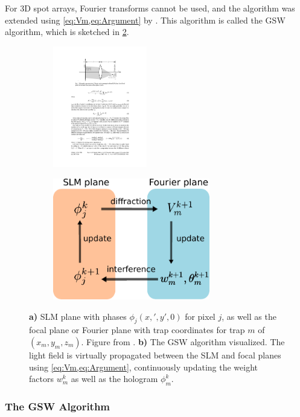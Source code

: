For 3D spot arrays, Fourier transforms cannot be used, and the algorithm was extended using \cref{eq:Vm,eq:Argument} by \cite{DiLeonardo2007}. 
This algorithm is called the \ac{GSW} algorithm, which is sketched in \cref{fig:GSWalgorithm}.

\begin{figure}
	\centering
	\begin{subfigure}{.56\textwidth}
		\centering
		\includegraphics[height=5.3cm]{figures/SLMgeometry.pdf}
		\caption{}
		\label{fig:SLMgeometry}
	\end{subfigure}
	\begin{subfigure}{.43\textwidth}
		\centering
		\includegraphics[height=5.3cm]{figures/WeightedGerschbergSaxton.pdf}
		\caption{}
		\label{fig:GSWalgorithm}
	\end{subfigure}
	\caption{\textsf{\textbf{a)}} SLM plane with phases $\phi_j(x,',y',0)$ for pixel $j$, as well as the focal plane or Fourier plane with trap coordinates for trap $m$ of $(x_m,y_m,z_m)$. 
		Figure from \cite{DiLeonardo2007}. 
		\textsf{\textbf{b)}} The \ac{GSW} algorithm visualized.
		The light field is virtually propagated between the SLM and focal planes using \cref{eq:Vm,eq:Argument}, continuously updating the weight factors $w_m^k$ as well as the hologram $\phi_m^k$.}
	\label{fig:GerschbergSaxton}
\end{figure}

\subsubsection*{The GSW Algorithm}

